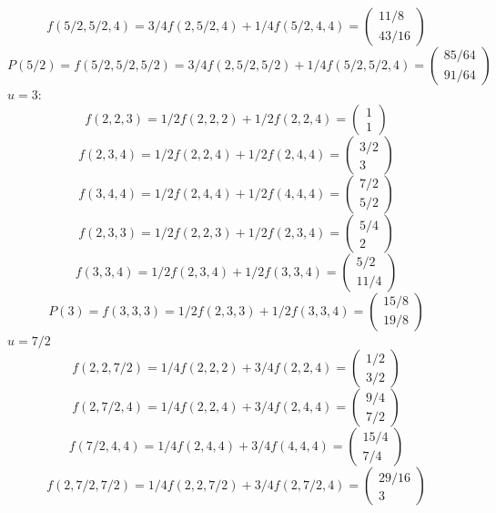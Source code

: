 \documentclass{article}
\begin{document}
	$$f(5/2,5/2,4)=3/4f(2,5/2,4)+1/4f(5/2,4,4)=\left(\begin{array}{c} 11/8\\43/16 \end{array}\right)$$
	$$P(5/2)=f(5/2,5/2,5/2)=3/4f(2,5/2,5/2)+1/4f(5/2,5/2,4)=\left(\begin{array}{c} 85/64\\91/64 \end{array}\right)$$
	$u=3$:\\
	$$f(2,2,3)=1/2f(2,2,2)+1/2f(2,2,4)=\left(\begin{array}{c} 1\\1 \end{array}\right)$$
	$$f(2,3,4)=1/2f(2,2,4)+1/2f(2,4,4)=\left(\begin{array}{c} 3/2\\3 \end{array}\right)$$
	$$f(3,4,4)=1/2f(2,4,4)+1/2f(4,4,4)=\left(\begin{array}{c} 7/2\\5/2 \end{array}\right)$$
	$$f(2,3,3)=1/2f(2,2,3)+1/2f(2,3,4)=\left(\begin{array}{c} 5/4\\2 \end{array}\right)$$
	$$f(3,3,4)=1/2f(2,3,4)+1/2f(3,3,4)=\left(\begin{array}{c} 5/2\\11/4 \end{array}\right)$$
	$$P(3)=f(3,3,3)=1/2f(2,3,3)+1/2f(3,3,4)=\left(\begin{array}{c} 15/8\\19/8 \end{array}\right)$$
	$u=7/2$\\
	$$f(2,2,7/2)=1/4f(2,2,2)+3/4f(2,2,4)=\left(\begin{array}{c} 1/2\\3/2 \end{array}\right)$$
	$$f(2,7/2,4)=1/4f(2,2,4)+3/4f(2,4,4)=\left(\begin{array}{c} 9/4\\7/2 \end{array}\right)$$
	$$f(7/2,4,4)=1/4f(2,4,4)+3/4f(4,4,4)=\left(\begin{array}{c} 15/4\\7/4 \end{array}\right)$$
	$$f(2,7/2,7/2)=1/4f(2,2,7/2)+3/4f(2,7/2,4)=\left(\begin{array}{c} 29/16\\3 \end{array}\right)$$
\end{document}
